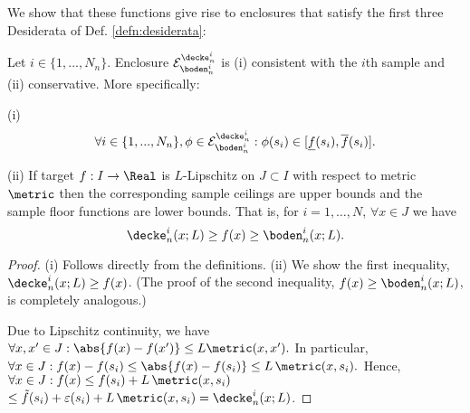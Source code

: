 We show that these functions give rise to enclosures that satisfy the first three Desiderata of Def. \ref{defn:desiderata}:
\begin{lem} 
\label{lem:samplefloorceiling}
Let  $i \in \{1,...,N_n\}$.
Enclosure $\mathcal E^{\decke_n^i}_{\boden_n^i}$ is (i) consistent with the $i$th sample and (ii) conservative. 
More specifically: 

(i)  \[\forall i \in \{1,...,N_n\}, \phi \in \mathcal E^{\decke_n^i}_{\boden_n^i}:  \phi(s_i) \in [\underline f(s_i), \overline f(s_i)].\]

(ii) If target $f: I \to \Real$ is $L$-Lipschitz on $J \subset I$ with respect to metric $\metric$ then the corresponding sample ceilings are upper bounds and the sample floor functions are lower bounds. That is, for $i =1,\ldots, N$, $\forall x \in J$ we have \[\decke_n^i (x; L) \geq f(x)  \geq  \boden_n^i (x; L).\]

\begin{proof}
(i) Follows directly from the definitions.
(ii) We show the first inequality, $\decke_n^i (x; L) \geq f(x)$. (The proof of the second inequality,  $f(x)  \geq  \boden_n^i (x; L)$, is completely analogous.) 

Due to Lipschitz continuity, we have 
$\forall x,x' \in J: \abs{f(x) - f(x')} \leq L \metric(x,x').$
In particular, 
$\forall x \in J: f(x) - f(s_i) \leq\abs{f(x) - f(s_i)} \leq L \, \metric(x, s_i).$
Hence, 
$\forall x \in J: f(x)  \leq f(s_i) + L \, \metric(x, s_i)$ 
$\leq \tilde f(s_i) +\varepsilon(s_i) + L \, \metric(x, s_i) = \decke_n^i (x; L)$.





\end{proof}
\end{lem}



